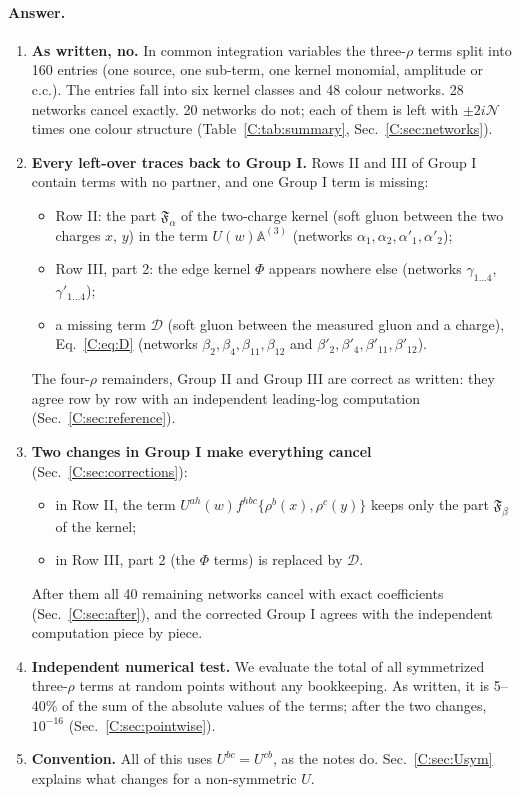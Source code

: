 \documentclass[10pt]{article}
\numberwithin{equation}{section}
\newcommand{\NN}{\mathcal N}
\begin{document}
\paragraph{Answer.}
\begin{enumerate}
\item \textbf{As written, no.} In common integration variables the three-$\rho$ terms split into 160 entries (one source, one sub-term, one kernel monomial, amplitude or c.c.). The entries fall into six kernel classes and 48 colour networks. 28 networks cancel exactly. 20 networks do not; each of them is left with $\pm2i\NN$ times one colour structure (Table~\ref{C:tab:summary}, Sec.~\ref{C:sec:networks}).
\item \textbf{Every left-over traces back to Group I.} Rows II and III of Group I contain terms with no partner, and one Group I term is missing:
\begin{itemize}
\item Row II: the part $\mathfrak F_\alpha$ of the two-charge kernel (soft gluon between the two charges $x$, $y$) in the term $U(w)\mathbb A^{(3)}$ (networks $\alpha_1,\alpha_2,\alpha'_1,\alpha'_2$);
\item Row III, part 2: the edge kernel $\Phi$ appears nowhere else (networks $\gamma_{1\ldots4}$, $\gamma'_{1\ldots4}$);
\item a missing term $\mathcal D$ (soft gluon between the measured gluon and a charge), Eq.~\eqref{C:eq:D} (networks $\beta_2,\beta_4,\beta_{11},\beta_{12}$ and $\beta'_2,\beta'_4,\beta'_{11},\beta'_{12}$).
\end{itemize}
The four-$\rho$ remainders, Group II and Group III are correct as written: they agree row by row with an independent leading-log computation (Sec.~\ref{C:sec:reference}).
\item \textbf{Two changes in Group I make everything cancel} (Sec.~\ref{C:sec:corrections}):
\begin{itemize}
\item[(1)] in Row II, the term $U^{ah}(w)f^{hbc}\{\rho^b(x),\rho^c(y)\}$ keeps only the part $\mathfrak F_\beta$ of the kernel;
\item[(2)] in Row III, part 2 (the $\Phi$ terms) is replaced by $\mathcal D$.
\end{itemize}
After them all 40 remaining networks cancel with exact coefficients (Sec.~\ref{C:sec:after}), and the corrected Group I agrees with the independent computation piece by piece.
\item \textbf{Independent numerical test.} We evaluate the total of all symmetrized three-$\rho$ terms at random points without any bookkeeping. As written, it is 5--40\% of the sum of the absolute values of the terms; after the two changes, $10^{-16}$ (Sec.~\ref{C:sec:pointwise}).
\item \textbf{Convention.} All of this uses $U^{bc}=U^{cb}$, as the notes do. Sec.~\ref{C:sec:Usym} explains what changes for a non-symmetric $U$.
\end{enumerate}
\end{document}
